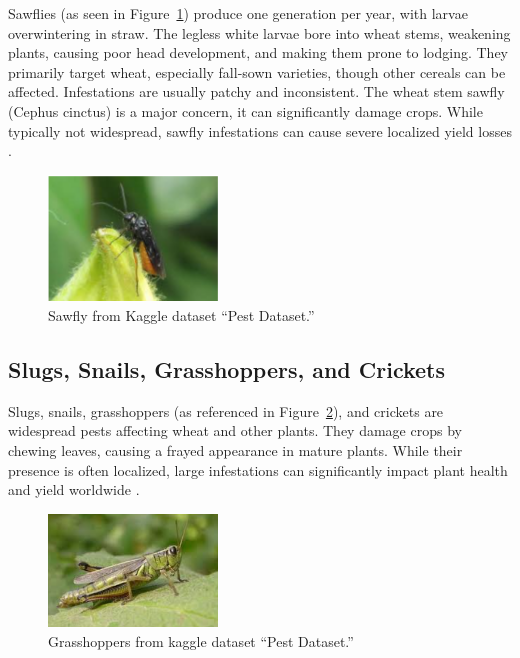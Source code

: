 Sawflies (as seen in Figure~\ref{fig:Figure17}) produce one generation per year, with larvae overwintering in straw. The legless white larvae bore into wheat stems, weakening plants, causing poor head development, and making them prone to lodging. They primarily target wheat, especially fall-sown varieties, though other cereals can be affected. Infestations are usually patchy and inconsistent. The wheat stem sawfly (Cephus cinctus) is a major concern, it can significantly damage crops. While typically not widespread, sawfly infestations can cause severe localized yield losses \parencite{duveiller2012wheat}.

\begin{figure}[H]
    \centering
    \includegraphics[width=0.4\textwidth]{chapters/chapter2/images/Figure17.png}
    \caption{Sawfly from Kaggle dataset “Pest Dataset.”}
    \label{fig:Figure17}
\end{figure}

\subsection{Slugs, Snails, Grasshoppers, and Crickets}
Slugs, snails, grasshoppers (as referenced in Figure~\ref{fig:Figure18}), and crickets are widespread pests affecting wheat and other plants. They damage crops by chewing leaves, causing a frayed appearance in mature plants. While their presence is often localized, large infestations can significantly impact plant health and yield worldwide \parencite{duveiller2012wheat}.


\begin{figure}[H]
    \centering
    \includegraphics[width=0.4\textwidth]{chapters/chapter2/images/Figure18.png}
    \caption{Grasshoppers from kaggle dataset “Pest Dataset.”}
    \label{fig:Figure18}
\end{figure}

